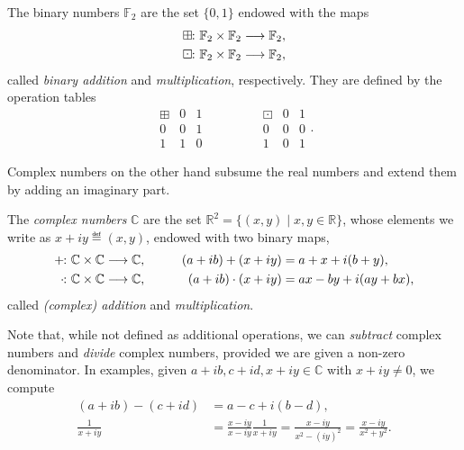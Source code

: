 \documentclass[a4paper, oneside, 12pt]{amsart}
\begin{document}
\begin{definition}\label{def:the-field-f2}
  The binary numbers \(\mathbb{F}_{2}\) are the set \(\{0,1\}\) endowed with the maps
  \begin{align*}
    \boxplus & \from \mathbb{F}_{2} \times \mathbb{F}_{2} \to \mathbb{F}_{2}, \\
    \boxdot & \from \mathbb{F}_{2} \times \mathbb{F}_{2} \to \mathbb{F}_{2},
  \end{align*}
  called \emph{binary addition} and \emph{multiplication}, respectively.
  They are defined by the operation tables
  \begin{equation}
    \begin{array}{c|cc}
      \boxplus & 0 & 1 \\
      \hline
      0 & 0 & 1 \\
      1 & 1 & 0
    \end{array}
    \qquad\qquad
    \begin{array}{c|cc}
      \boxdot & 0 & 1 \\
      \hline
      0 & 0 & 0 \\
      1 & 0 & 1
    \end{array}.
  \end{equation}
\end{definition}

Complex numbers on the other hand subsume the real numbers and extend them by adding an imaginary part.

\begin{definition}\label{def:complex-numbers}
  The \emph{complex numbers} \( \mathbb{C} \) are the set \( \mathbb{R}^2 = \{(x, y) \mid x, y \in \mathbb{R}\} \), whose elements we write as \(x+iy\eqdef (x,y)\), endowed with two binary maps,
  \begin{align*}
    + & \from \mathbb{C} \times \mathbb{C} \to \mathbb{C}, \qquad & (a+ ib) + (x + iy) &= a+x + i(b+y), \\
    \cdot & \from \mathbb{C} \times \mathbb{C} \to \mathbb{C}, \qquad &   (a+ ib) \cdot (x +iy) &= ax - by +i(ay + bx),
  \end{align*}
  called \emph{(complex) addition} and \emph{multiplication}.
\end{definition}

Note that, while not defined as additional operations, we can \emph{subtract} complex numbers and \emph{divide} complex numbers, provided we are given a non-zero denominator.
In examples,
given \(a+ib, c+id, x+iy \in \mathbb{C}\) with \(x+iy \neq 0\), we compute
\begin{align*}
  (a+ib) - (c+id)
  & = a-c + i(b-d), \\
  \frac{1}{x+iy}
  & = \frac{x - iy}{x - iy} \frac{1}{x + iy}
    = \frac{x - iy}{x^{2} - (iy)^{2}}
    = \frac{x - iy}{x^{2}+y^{2}}.
\end{align*}
\end{document}
